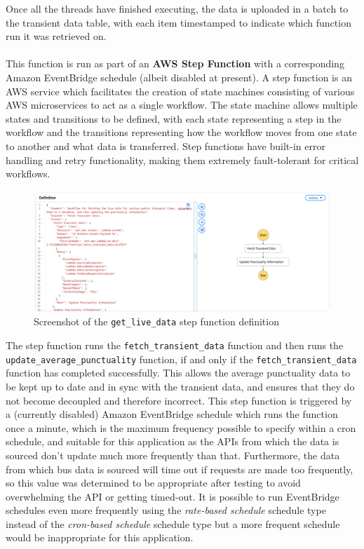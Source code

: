 \documentclass[a4paper,11pt]{report}
\begin{document}
Once all the threads have finished executing, the data is uploaded in a batch to the transient data table, with each item timestamped to indicate which function run it was retrieved on.
\\\\
This function is run as part of an \textbf{AWS Step Function} with a corresponding Amazon EventBridge schedule (albeit disabled at present).
A step function is an AWS service which facilitates the creation of state machines consisting of various AWS microservices to act as a single workflow.
The state machine allows multiple states and transitions to be defined, with each state representing a step in the workflow and the transitions representing how the workflow moves from one state to another and what data is transferred.
Step functions have built-in error handling and retry functionality, making them extremely fault-tolerant for critical workflows.

\begin{figure}[H]
    \centering
    \includegraphics[width=\textwidth]{./images/get_live_data_definiton.png}
    \caption{Screenshot of the \texttt{get\_live\_data} step function definition}
\end{figure}

The step function runs the \verb|fetch_transient_data| function and then runs the \verb|update_average_punctuality| function, if and only if the \verb|fetch_transient_data| function has completed successfully.
This allows the average punctuality data to be kept up to date and in sync with the transient data, and ensures that they do not become decoupled and therefore incorrect.
This step function is triggered by a (currently disabled) Amazon EventBridge schedule which runs the function once a minute, which is the maximum frequency possible to specify within a cron schedule, and suitable for this application as the APIs from which the data is sourced don't update much more frequently than that.
Furthermore, the data from which bus data is sourced will time out if requests are made too frequently, so this value was determined to be appropriate after testing to avoid overwhelming the API or getting timed-out. 
It is possible to run EventBridge schedules even more frequently using the \textit{rate-based schedule} schedule type instead of the \textit{cron-based schedule} schedule type but a more frequent schedule would be inappropriate for this application.
\end{document}
